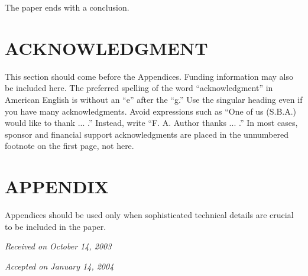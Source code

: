 The paper ends with a conclusion.




\section*{ACKNOWLEDGMENT}

This section should come before the Appendices. Funding information may also be included here. The preferred spelling of the word ``acknowledgment'' in American English is without an ``e'' after the ``g.'' Use the singular heading even if you have many acknowledgments. Avoid expressions such as ``One of us (S.B.A.) would like to thank ... .'' Instead, write ``F. A. Author thanks ... .'' In most cases, sponsor and financial support acknowledgments are placed in the unnumbered footnote on the first page, not here.

\section*{APPENDIX}

Appendices should be used only when sophisticated technical details are crucial to be included in the paper.

%
\hfill {\it Received on October 14, 2003}

\hfill {\it Accepted on January 14, 2004}

